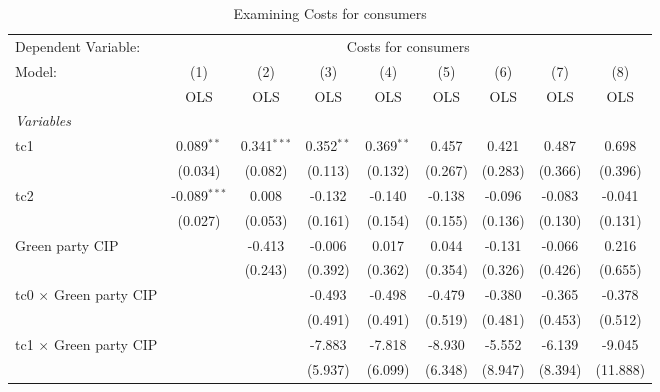
\begin{table}[htbp]
   \caption{Examining Costs for consumers}
   \centering
   \begin{tabular}{lcccccccc}
      \toprule
      Dependent Variable: & \multicolumn{8}{c}{Costs for consumers}\\
      Model:                                  & (1)            & (2)           & (3)          & (4)          & (5)     & (6)     & (7)     & (8)\\  
                                              &  OLS           & OLS           & OLS          & OLS          & OLS     & OLS     & OLS     & OLS\\  
      \midrule
      \emph{Variables}\\
      tc1                                     & 0.089$^{**}$   & 0.341$^{***}$ & 0.352$^{**}$ & 0.369$^{**}$ & 0.457   & 0.421   & 0.487   & 0.698\\   
                                              & (0.034)        & (0.082)       & (0.113)      & (0.132)      & (0.267) & (0.283) & (0.366) & (0.396)\\   
      tc2                                     & -0.089$^{***}$ & 0.008         & -0.132       & -0.140       & -0.138  & -0.096  & -0.083  & -0.041\\   
                                              & (0.027)        & (0.053)       & (0.161)      & (0.154)      & (0.155) & (0.136) & (0.130) & (0.131)\\   
      Green party CIP                         &                & -0.413        & -0.006       & 0.017        & 0.044   & -0.131  & -0.066  & 0.216\\   
                                              &                & (0.243)       & (0.392)      & (0.362)      & (0.354) & (0.326) & (0.426) & (0.655)\\   
      tc0 $\times$ Green party CIP            &                &               & -0.493       & -0.498       & -0.479  & -0.380  & -0.365  & -0.378\\   
                                              &                &               & (0.491)      & (0.491)      & (0.519) & (0.481) & (0.453) & (0.512)\\   
      tc1 $\times$ Green party CIP            &                &               & -7.883       & -7.818       & -8.930  & -5.552  & -6.139  & -9.045\\   
                                              &                &               & (5.937)      & (6.099)      & (6.348) & (8.947) & (8.394) & (11.888)\\   

\end{tabular}
\end{table}
